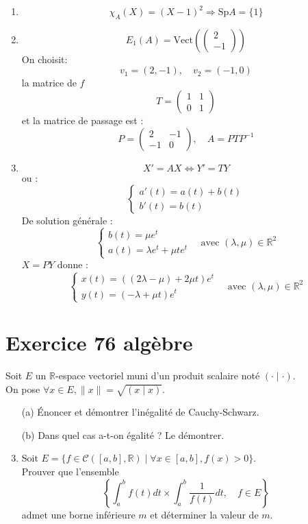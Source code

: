 \documentclass[a4paper,12pt,oneside]{book}
\newenvironment{statement}{\begin{statementbox}}{\end{statementbox}}
\newenvironment{solution}{\begin{solutionbox}}{\end{solutionbox}}
\begin{document}
\begin{solution}
	\begin{enumerate}
		\item \[
		\chi_A(X) = (X - 1)^2 \Rightarrow \text{Sp}A = \{1\}
		\]
		\item \[
		E_1(A) = \mathrm{Vect} \left( \begin{pmatrix} 2 \\ -1 \end{pmatrix} \right)
		\]
		On choisit:
		\[
		v_1 = (2, -1), \quad v_2 = (-1, 0)
		\]
		la matrice de \( f \) 
		\[
		T = \begin{pmatrix} 1 & 1 \\ 0 & 1 \end{pmatrix}
		\]
		et la matrice de passage est :
		\[
		P = \begin{pmatrix} 2 & -1 \\ -1 & 0 \end{pmatrix}, \quad A = P T P^{-1}
		\]
		
		\item \[
		X' = A X \iff Y' = T Y
		\]
		ou :
		\[
		\begin{cases}
			a'(t) = a(t) + b(t) \\
			b'(t) = b(t)
		\end{cases}
		\]
		De solution générale :
		\[
		\begin{cases}
			b(t) = \mu e^{t} \\
			a(t) = \lambda e^{t} + \mu t e^{t}
		\end{cases}
		\quad \text{avec } (\lambda, \mu) \in \mathbb{R}^2
		\]
		\( X = P Y \) donne :
		\[
		\begin{cases}
			x(t) = ((2\lambda - \mu) + 2\mu t)e^{t} \\
			y(t) = (-\lambda + \mu t)e^{t}
		\end{cases}
		\quad \text{avec } (\lambda, \mu) \in \mathbb{R}^2
		\]
	\end{enumerate}
\end{solution}

	\section*{Exercice 76 \quad algèbre}
	\begin{statement}
		Soit \(E\) un \(\mathbb{R}\)-espace vectoriel muni d’un produit scalaire noté \(( \cdot \mid \cdot )\).\\
		On pose \(\forall x \in E, \|x\| = \sqrt{(x \mid x)}\).
		\begin{enumerate}
			\item[(a)] Énoncer et démontrer l’inégalité de Cauchy-Schwarz.
			\item[(b)] Dans quel cas a-t-on égalité ? Le démontrer.
			\item Soit \( E = \{ f \in \mathcal{C}([a,b], \mathbb{R}) \mid \forall x \in [a,b], f(x) > 0 \} \).\\
			Prouver que l’ensemble
			\[
			\left\{ \int_a^b f(t) dt \times \int_a^b \frac{1}{f(t)} dt, \quad f \in E \right\}
			\]
			admet une borne inférieure \(m\) et déterminer la valeur de \(m\).
		\end{enumerate}
	\end{statement}
	
\end{document}
